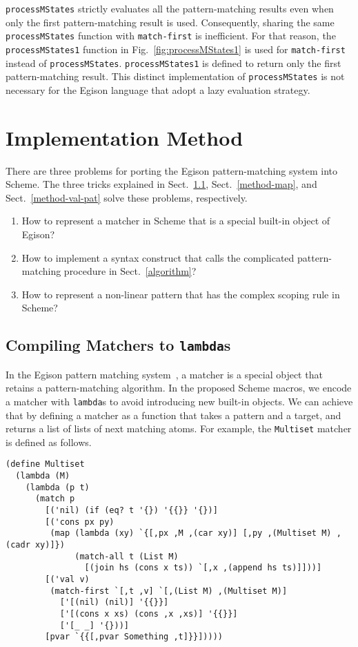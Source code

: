 \documentclass[acmlarge]{acmart}
\newcommand{\new}[1]{\textcolor{blue}{#1}}
\begin{document}
\texttt{processMStates} strictly evaluates all the pattern-matching results even when only the first pattern-matching result is used.
Consequently, sharing the same \texttt{processMStates} function with \texttt{match-first} is inefficient.
For that reason, the \texttt{processMStates1} function in Fig.~\ref{fig:processMStates1} is used for \texttt{match-first} instead of \texttt{processMStates}.
\texttt{processMStates1} is defined to return only the first pattern-matching result.
This distinct implementation of \lstinline{processMStates} is not necessary for the Egison language that adopt a lazy evaluation strategy.

\section{Implementation Method}\label{method}

There are three problems for porting the Egison pattern-matching system into Scheme.
The three tricks explained in Sect.~\ref{method-matcher}, Sect.~\ref{method-map}, and Sect.~\ref{method-val-pat} solve these problems, respectively.

\begin{enumerate}
\item How to represent a matcher in Scheme that is a special built-in object of Egison?
\item How to implement a syntax construct that calls the complicated pattern-matching procedure in Sect.~\ref{algorithm}?
\item How to represent a non-linear pattern that has the complex scoping rule in Scheme?
\end{enumerate}

\subsection{Compiling Matchers to \lstinline{lambda}s}\label{method-matcher}

In the Egison pattern matching system~\cite{egi2018aplas}, a matcher is a special object that retains a pattern-matching algorithm.
In the proposed Scheme macros, we encode a matcher with \texttt{lambda}s to avoid introducing new built-in objects.
We can achieve that by defining a matcher as a function that takes a pattern and a target, and returns a list of lists of next matching atoms.
For example, the \lstinline{Multiset} matcher is defined as follows.

\begin{lstlisting}[language=egison]
(define Multiset
  (lambda (M)
    (lambda (p t)
      (match p
        [('nil) (if (eq? t '{}) '{{}} '{})]
        [('cons px py)
         (map (lambda (xy) `{[,px ,M ,(car xy)] [,py ,(Multiset M) ,(cadr xy)]})
              (match-all t (List M)
                [(join hs (cons x ts)) `[,x ,(append hs ts)]]))]
        [('val v)
         (match-first `[,t ,v] `[,(List M) ,(Multiset M)]
           ['[(nil) (nil)] '{{}}]
           ['[(cons x xs) (cons ,x ,xs)] '{{}}]
           ['[_ _] '{}))]
        [pvar `{{[,pvar Something ,t]}}]))))
\end{lstlisting}
\end{document}
